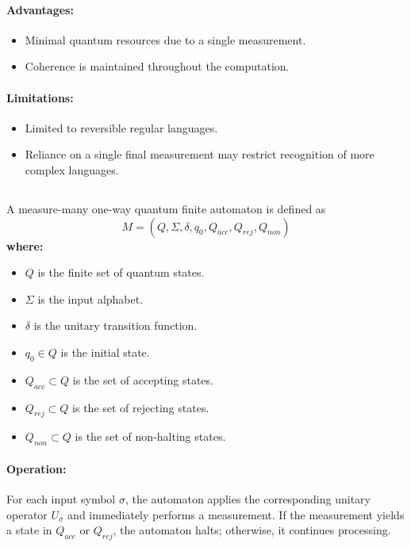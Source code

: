 \paragraph{Advantages:}
\begin{itemize}
    \item Minimal quantum resources due to a single measurement.
    \item Coherence is maintained throughout the computation.
\end{itemize}

\paragraph{Limitations:}
\begin{itemize}
    \item Limited to reversible regular languages.
    \item Reliance on a single final measurement may restrict recognition of more complex languages.
\end{itemize}

\subsection{}
\label{subsec:mm-1qfa}
\begin{definition}
A measure-many one-way quantum finite automaton is defined as 
\[
M = (Q, \Sigma, \delta, q_0, Q_{acc}, Q_{rej}, Q_{non})
\]
\textbf{where:}
\begin{itemize}
    \item \( Q \) is the finite set of quantum states.
    \item \( \Sigma \) is the input alphabet.
    \item \( \delta \) is the unitary transition function.
    \item \( q_0 \in Q \) is the initial state.
    \item \( Q_{acc} \subset Q \) is the set of accepting states.
    \item \( Q_{rej} \subset Q \) is the set of rejecting states.
    \item \( Q_{non} \subset Q \) is the set of non-halting states.
\end{itemize}
\end{definition}

\paragraph{Operation:}  
For each input symbol \( \sigma \), the automaton applies the corresponding unitary operator \( U_\sigma \) and immediately performs a measurement. If the measurement yields a state in \( Q_{acc} \) or \( Q_{rej} \), the automaton halts; otherwise, it continues processing.

